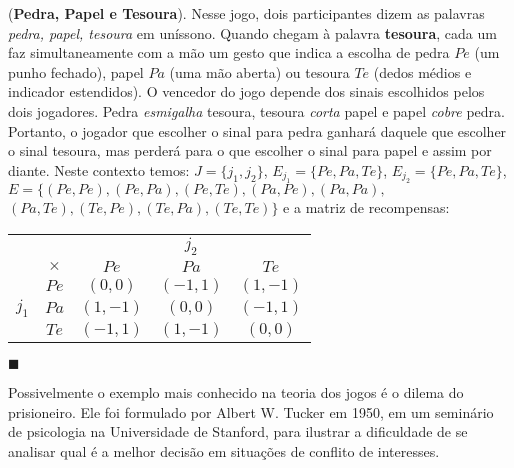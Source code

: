 \begin{ex}\label{ppt} (\textbf{Pedra, Papel e Tesoura}). Nesse jogo, dois participantes dizem as palavras \textit{pedra, papel, tesoura} em uníssono. Quando chegam à palavra \textbf{tesoura}, cada um faz simultaneamente com a mão um gesto que indica a escolha de pedra $Pe$ (um punho fechado), papel $Pa$ (uma mão aberta) ou tesoura $Te$ (dedos médios e indicador estendidos). O vencedor do jogo depende dos sinais escolhidos pelos dois jogadores. Pedra \textit{esmigalha} tesoura, tesoura \textit{corta} papel e papel \textit{cobre} pedra. Portanto, o jogador que escolher o sinal para pedra ganhará daquele que escolher o sinal tesoura, mas perderá para o que escolher o sinal para papel e assim por diante. Neste contexto temos: $J=\{j_1,j_2\}$, $E_{j_1}=\{Pe,Pa,Te\}$, $E_{j_2}=\{Pe,Pa,Te\}$, $E=\{(Pe,Pe),(Pe,Pa),(Pe,Te),(Pa,Pe),(Pa,Pa),$\\$(Pa,Te),(Te,Pe),(Te,Pa),(Te,Te)\}$ e a matriz de recompensas:

\begin{center}
\begin{tabular}[H]{c|c|c|c|c|}
\multicolumn{2}{c}{} & \multicolumn{3}{c}{$j_2$} \\\cline{2-5}
& $\times$ & $Pe$ & $Pa$ & $Te$\\\cline{2-5}
\multirow{3}{*}{$j_1$} & $Pe$ & $(0,0)$ & $(-1,1)$ & $(1,-1)$\\\cline{2-5}
& $Pa$ & $(1,-1)$ & $(0,0)$ & $(-1,1)$\\\cline{2-5}
& $Te$ & $(-1,1)$ & $(1,-1)$ & $(0,0)$\\\cline{2-5}
\end{tabular}
\end{center}\vspace{1cm}

\hfill$\blacksquare$

\end{ex}

Possivelmente o exemplo mais conhecido na teoria dos jogos é o dilema do prisioneiro. Ele foi formulado por Albert W. Tucker em 1950, em um seminário de psicologia na Universidade de Stanford, para ilustrar a dificuldade de se analisar qual é a melhor decisão em situações de conflito de interesses.

